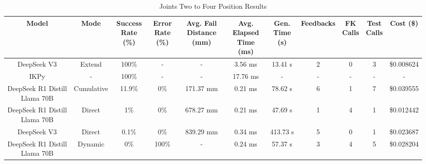 \begin{landscape}
\begin{table}[H]
\tiny
\renewcommand{\arraystretch}{1.2}
\caption{Joints Two to Four Position Results}
\begin{center}
\begin{tabular}{|c|c|c|c|c|c|c|c|c|c|c|}
    \hline
    \textbf{Model} & 
    \textbf{Mode} & 
    \makecell{\textbf{Success}\\\textbf{Rate (\%)}} &
    \makecell{\textbf{Error}\\\textbf{Rate (\%)}} &
    \makecell{\textbf{Avg. Fail}\\\textbf{Distance (mm)}} &
    \makecell{\textbf{Avg. Elapsed}\\\textbf{Time (ms)}} &
    \makecell{\textbf{Gen.}\\\textbf{Time (s)}} &
    \textbf{Feedbacks} &
    \makecell{\textbf{FK}\\\textbf{Calls}} &
    \makecell{\textbf{Test}\\\textbf{Calls}} &
    \textbf{Cost (\$)} \\
    \hline
    DeepSeek V3 & Extend & 100\% & - & - & 3.56 ms & 13.41 s & 2 & 0 & 3 & \$0.008624 \\
    \hline
    IKPy & - & 100\% & - & - & 17.76 ms & - & - & - & - & - \\
    \hline
    DeepSeek R1 Distill Llama 70B & Cumulative & 11.9\% & 0\% & 171.37 mm & 0.21 ms & 78.62 s & 6 & 1 & 7 & \$0.039555 \\
    \hline
    DeepSeek R1 Distill Llama 70B & Direct & 1\% & 0\% & 678.27 mm & 0.21 ms & 47.69 s & 1 & 4 & 1 & \$0.012442 \\
    \hline
    DeepSeek V3 & Direct & 0.1\% & 0\% & 839.29 mm & 0.34 ms & 413.73 s & 5 & 0 & 1 & \$0.023687 \\
    \hline
    DeepSeek R1 Distill Llama 70B & Dynamic & 0\% & 100\% & - & 0.24 ms & 57.37 s & 3 & 4 & 5 & \$0.028204 \\
    \hline
\end{tabular}
\label{Results-Position-2-4}
\end{center}
\end{table}


\end{landscape}
